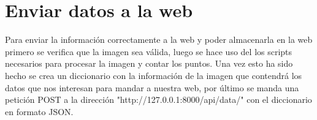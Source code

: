 \section{Enviar datos a la web }
Para enviar la información correctamente a la web y poder almacenarla en la web primero se verifica que la imagen sea válida, luego se hace uso del los scripts necesarios para procesar la imagen y contar los puntos. Una vez esto ha sido hecho se crea un diccionario con la información de la imagen  que contendrá los datos que nos interesan para mandar a nuestra web, por último se manda una petición POST a la dirección "http://127.0.0.1:8000/api/data/" con el diccionario en formato JSON.